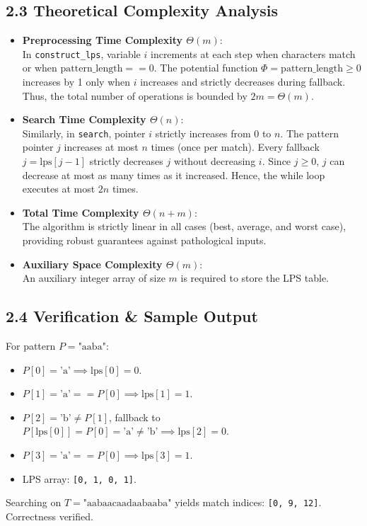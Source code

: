 \documentclass[12pt]{article}
\begin{document}
\subsection*{2.3 Theoretical Complexity Analysis}
\begin{itemize}
    \item \textbf{Preprocessing Time Complexity $\Theta(m)$}:\\
    In \texttt{construct\_lps}, variable $i$ increments at each step when characters match or when $\text{pattern\_length} == 0$. The potential function $\Phi = \text{pattern\_length} \ge 0$ increases by 1 only when $i$ increases and strictly decreases during fallback. Thus, the total number of operations is bounded by $2m = \Theta(m)$.

    \item \textbf{Search Time Complexity $\Theta(n)$}:\\
    Similarly, in \texttt{search}, pointer $i$ strictly increases from $0$ to $n$. The pattern pointer $j$ increases at most $n$ times (once per match). Every fallback $j = \text{lps}[j-1]$ strictly decreases $j$ without decreasing $i$. Since $j \ge 0$, $j$ can decrease at most as many times as it increased. Hence, the while loop executes at most $2n$ times.

    \item \textbf{Total Time Complexity $\Theta(n + m)$}:\\
    The algorithm is strictly linear in all cases (best, average, and worst case), providing robust guarantees against pathological inputs.

    \item \textbf{Auxiliary Space Complexity $\Theta(m)$}:\\
    An auxiliary integer array of size $m$ is required to store the LPS table.
\end{itemize}

\subsection*{2.4 Verification \& Sample Output}
For pattern $P = \text{"aaba"}$:
\begin{itemize}
    \item $P[0] = \text{'a'} \implies \text{lps}[0] = 0$.
    \item $P[1] = \text{'a'} == P[0] \implies \text{lps}[1] = 1$.
    \item $P[2] = \text{'b'} \ne P[1]$, fallback to $P[\text{lps}[0]] = P[0] = \text{'a'} \ne \text{'b'} \implies \text{lps}[2] = 0$.
    \item $P[3] = \text{'a'} == P[0] \implies \text{lps}[3] = 1$.
    \item LPS array: \texttt{[0, 1, 0, 1]}.
\end{itemize}
Searching on $T = \text{"aabaacaadaabaaba"}$ yields match indices: \texttt{[0, 9, 12]}. Correctness verified.
\end{document}

